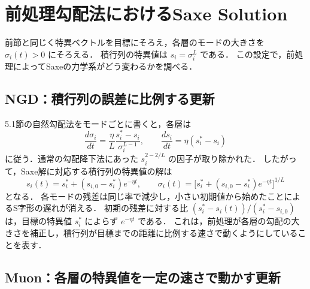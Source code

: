 \documentclass[../main.tex]{subfiles}
\begin{document}
\section{前処理勾配法におけるSaxe Solution}
\label{sec:linear-preconditioned-modes}

前節と同じく特異ベクトルを目標にそろえ，各層のモードの大きさを $\sigma_i(t)>0$ にそろえる．
積行列の特異値は $s_i=\sigma_i^L$ である．
この設定で，前処理によってSaxeの力学系がどう変わるかを調べる．

\subsection{NGD：積行列の誤差に比例する更新}

5.1節の自然勾配法をモードごとに書くと，各層は
\begin{equation}
  \frac{d\sigma_i}{dt}
  =\frac{\eta}{L}\frac{s_i^*-s_i}{\sigma_i^{L-1}},
  \qquad
  \frac{ds_i}{dt}=\eta(s_i^*-s_i)
  \label{eq:linear-ngd-mode-ode}
\end{equation}
に従う．通常の勾配降下法にあった $s_i^{2-2/L}$ の因子が取り除かれた．
したがって，Saxe解に対応する積行列の特異値の解は
\begin{equation}
  s_i(t)=s_i^*+(s_{i,0}-s_i^*)e^{-\eta t},
  \qquad
  \sigma_i(t)=\bigl[s_i^*+(s_{i,0}-s_i^*)e^{-\eta t}\bigr]^{1/L}
  \label{eq:linear-ngd-mode-solution}
\end{equation}
となる\cite{bernacchia2018exact,huh2020curvature}．
各モードの残差は同じ率で減少し，小さい初期値から始めたことによるS字形の遅れが消える．
初期の残差に対する比 $(s_i^*-s_i(t))/(s_i^*-s_{i,0})$ は，目標の特異値 $s_i^*$ によらず $e^{-\eta t}$ である．
これは，前処理が各層の勾配の大きさを補正し，積行列が目標までの距離に比例する速さで動くようにしていることを表す．

\subsection{Muon：各層の特異値を一定の速さで動かす更新}
\end{document}
